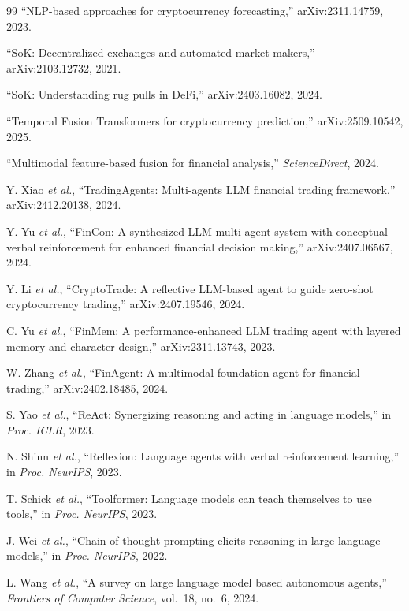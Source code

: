 \documentclass[12pt,a4paper,oneside,openany]{book}
\begin{document}
\begin{itemize}[leftmargin=8mm]
\begin{thebibliography}{99}
 ``NLP-based approaches for cryptocurrency forecasting,'' arXiv:2311.14759, 2023.

 ``SoK: Decentralized exchanges and automated market makers,'' arXiv:2103.12732, 2021.

 ``SoK: Understanding rug pulls in DeFi,'' arXiv:2403.16082, 2024.

 ``Temporal Fusion Transformers for cryptocurrency prediction,'' arXiv:2509.10542, 2025.

 ``Multimodal feature-based fusion for financial analysis,'' \textit{ScienceDirect}, 2024.

 Y. Xiao \textit{et al.}, ``TradingAgents: Multi-agents LLM financial trading framework,'' arXiv:2412.20138, 2024.

 Y. Yu \textit{et al.}, ``FinCon: A synthesized LLM multi-agent system with conceptual verbal reinforcement for enhanced financial decision making,'' arXiv:2407.06567, 2024.

 Y. Li \textit{et al.}, ``CryptoTrade: A reflective LLM-based agent to guide zero-shot cryptocurrency trading,'' arXiv:2407.19546, 2024.

 C. Yu \textit{et al.}, ``FinMem: A performance-enhanced LLM trading agent with layered memory and character design,'' arXiv:2311.13743, 2023.

 W. Zhang \textit{et al.}, ``FinAgent: A multimodal foundation agent for financial trading,'' arXiv:2402.18485, 2024.

 S. Yao \textit{et al.}, ``ReAct: Synergizing reasoning and acting in language models,'' in \textit{Proc. ICLR}, 2023.

 N. Shinn \textit{et al.}, ``Reflexion: Language agents with verbal reinforcement learning,'' in \textit{Proc. NeurIPS}, 2023.

 T. Schick \textit{et al.}, ``Toolformer: Language models can teach themselves to use tools,'' in \textit{Proc. NeurIPS}, 2023.

 J. Wei \textit{et al.}, ``Chain-of-thought prompting elicits reasoning in large language models,'' in \textit{Proc. NeurIPS}, 2022.

 L. Wang \textit{et al.}, ``A survey on large language model based autonomous agents,'' \textit{Frontiers of Computer Science}, vol.~18, no.~6, 2024.


\end{thebibliography}
\end{itemize}
\end{document}
